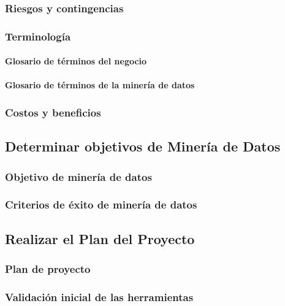     \subsubsection{Riesgos y contingencias}
    \subsubsection{Terminología}
        \paragraph{Glosario de términos del negocio}
        \paragraph{Glosario de términos de la minería de datos}
    \subsubsection{Costos y beneficios}
\subsection{Determinar objetivos de Minería de Datos}
    \subsubsection{Objetivo de minería de datos}
    \subsubsection{Criterios de éxito de minería de datos}
\subsection{Realizar el Plan del Proyecto}
    \subsubsection{Plan de proyecto}
    \subsubsection{Validación inicial de las herramientas}